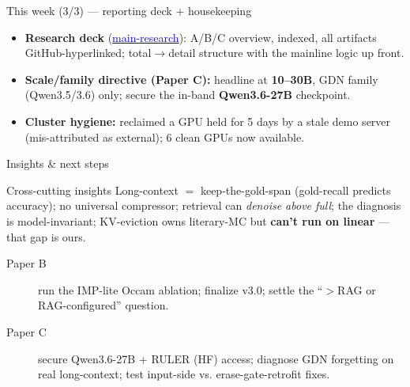 \begin{frame}{This week (3/3) --- reporting deck + housekeeping}
  \small
  \begin{itemize}
    \item \textbf{Research deck} (\href{../main-research.pdf}{\textcolor{blue}{main-research}}): A/B/C overview, indexed, all artifacts GitHub-hyperlinked; total$\to$detail structure with the mainline logic up front.
    \item \textbf{Scale/family directive (Paper C):} headline at \textbf{10--30B}, GDN family (Qwen3.5/3.6) only; secure the in-band \textbf{Qwen3.6-27B} checkpoint.
    \item \textbf{Cluster hygiene:} reclaimed a GPU held for 5 days by a stale demo server (mis-attributed as external); 6 clean GPUs now available.
  \end{itemize}
\end{frame}

\begin{frame}{Insights \& next steps}
  \small
  \begin{block}{Cross-cutting insights}
    Long-context $=$ keep-the-gold-span (gold-recall predicts accuracy); no universal compressor; retrieval can \emph{denoise above full}; the diagnosis is model-invariant; KV-eviction owns literary-MC but \textbf{can't run on linear} --- that gap is ours.
  \end{block}
  \begin{description}
    \item[Paper B] run the IMP-lite Occam ablation; finalize v3.0; settle the ``$>$RAG or RAG-configured'' question.
    \item[Paper C] secure Qwen3.6-27B + RULER (HF) access; diagnose GDN forgetting on real long-context; test input-side vs. erase-gate-retrofit fixes.
  \end{description}
\end{frame}
